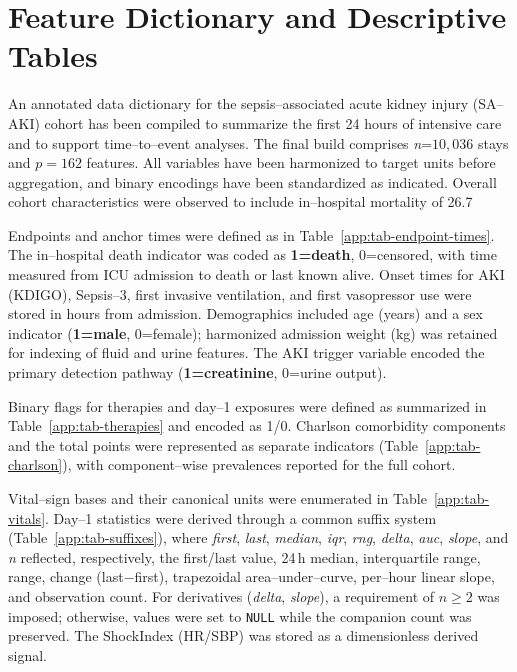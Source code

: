\chapter{Feature Dictionary and Descriptive Tables}\label{app:feature-dictionary}

\noindent An annotated data dictionary for the sepsis–associated acute kidney injury (SA–AKI) cohort has been compiled to summarize the first 24 hours of intensive care and to support time–to–event analyses. The final build comprises \textit{n}=$10{,}036$ stays and $p=162$ features. All variables have been harmonized to target units before aggregation, and binary encodings have been standardized as indicated. Overall cohort characteristics were observed to include in–hospital mortality of 26.7%

\medskip
\noindent Endpoints and anchor times were defined as in Table~\ref{app:tab-endpoint-times}. The in–hospital death indicator was coded as \textbf{1=death}, 0=censored, with time measured from ICU admission to death or last known alive. Onset times for AKI (KDIGO), Sepsis–3, first invasive ventilation, and first vasopressor use were stored in hours from admission. Demographics included age (years) and a sex indicator (\textbf{1=male}, 0=female); harmonized admission weight (kg) was retained for indexing of fluid and urine features. The AKI trigger variable encoded the primary detection pathway (\textbf{1=creatinine}, 0=urine output).

\medskip
\noindent Binary flags for therapies and day–1 exposures were defined as summarized in Table~\ref{app:tab-therapies} and encoded as 1/0. Charlson comorbidity components and the total points were represented as separate indicators (Table~\ref{app:tab-charlson}), with component–wise prevalences reported for the full cohort.

\medskip
\noindent Vital–sign bases and their canonical units were enumerated in Table~\ref{app:tab-vitals}. Day–1 statistics were derived through a common suffix system (Table~\ref{app:tab-suffixes}), where \textit{first}, \textit{last}, \textit{median}, \textit{iqr}, \textit{rng}, \textit{delta}, \textit{auc}, \textit{slope}, and \textit{n} reflected, respectively, the first/last value, 24\,h median, interquartile range, range, change (last$-$first), trapezoidal area–under–curve, per–hour linear slope, and observation count. For derivatives (\textit{delta}, \textit{slope}), a requirement of $n\ge2$ was imposed; otherwise, values were set to \texttt{NULL} while the companion count was preserved. The ShockIndex (HR/SBP) was stored as a dimensionless derived signal.


